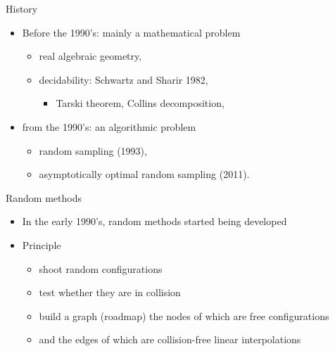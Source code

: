 
%
%

\begin{frame}{History}
  \begin{itemize}
  \item Before the 1990's: mainly a mathematical problem
    \begin{itemize}
    \item real algebraic geometry,
    \item decidability: Schwartz and Sharir 1982,
      \begin{itemize}
      \item Tarski theorem, Collins decomposition,
      \end{itemize}
    \end{itemize}
    \pause
  \item from the 1990's: an algorithmic problem
    \begin{itemize}
    \item random sampling (1993),
    \item asymptotically optimal random sampling (2011).
    \end{itemize}
  \end{itemize}
\end{frame}
%
%

\begin{frame} {Random methods}
  \begin{itemize}
  \item In the early 1990's, random methods started being developed
    \pause
  \item Principle
    \begin{itemize}
    \item shoot random configurations
      \pause
    \item test whether they are in collision
      \pause
    \item build a graph (roadmap)  the nodes of which are free configurations
      \pause
    \item  and the edges of which are collision-free linear interpolations
    \end{itemize}
  \end{itemize}
\end{frame}

%
%

